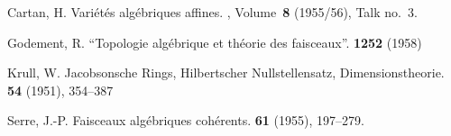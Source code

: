 \documentclass{article}
\begin{document}
\nocite{*}
\begin{thebibliography}{10}

  {\sc Cartan, H.}
  \newblock Vari\'{e}t\'{e}s alg\'{e}briques affines.
  , Volume~\textbf{8} (1955/56), Talk no.~3.

  {\sc Godement, R.}
  \newblock ``Topologie alg\'{e}brique et th\'{e}orie des faisceaux''.
   \textbf{1252} (1958)

  {\sc Krull, W.}
  \newblock Jacobsonsche Rings, Hilbertscher Nullstellensatz, Dimensionstheorie.
   \textbf{54} (1951), 354--387

  {\sc Serre, J.-P.}
  \newblock Faisceaux alg\'{e}briques coh\'{e}rents.
   \textbf{61} (1955), 197--279.

\end{thebibliography}
\end{document}
